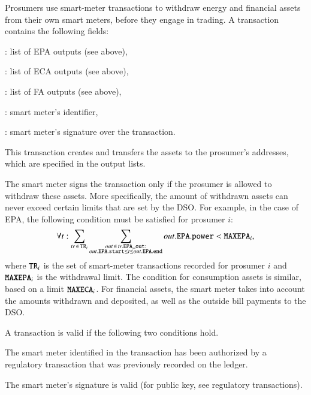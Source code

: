 Prosumers use smart-meter transactions to withdraw energy and financial assets from their own smart meters, before they engage in trading.
%
A transaction contains the following fields:
\begin{compactitem}
\item {}: list of EPA outputs (see above),
\item {}: list of ECA outputs (see above),
\item {}: list of FA outputs (see above),
\item {}: smart meter's identifier,
\item {}: smart meter's signature over the transaction.
\end{compactitem}
This transaction creates and transfers the assets to the prosumer's addresses, which are specified in the output lists.

The smart meter signs the transaction only if the prosumer is allowed to withdraw these assets.
More specifically, the amount of withdrawn assets can never exceed certain limits that are set by the DSO.
For example, in the case of EPA, the following condition must be satisfied for prosumer $i$:
\begin{equation}
\forall t: \sum_{tr \,\in\, \texttt{TR}_i} \sum_{\substack{out \,\in\, tr.\texttt{EPA\_out}:\\out.\texttt{EPA}.\texttt{start} \leq t \leq out.\texttt{EPA}.\texttt{end}}} out.\texttt{EPA}.\texttt{power} < \texttt{MAXEPA}_i ,
\end{equation}
where $\texttt{TR}_i$ is the set of smart-meter transactions recorded for prosumer $i$ and $\texttt{MAXEPA}_i$ is the withdrawal limit.
The condition for consumption assets is similar, based on a limit $\texttt{MAXECA}_i$.
For financial assets, the smart meter takes into account the amounts withdrawn and deposited, as well as the outside bill payments to the DSO.

A transaction is valid if the following two conditions hold.
\begin{compactitem}
\item The smart meter identified in the transaction has been authorized by a regulatory transaction that was previously recorded on the ledger.
\item The smart meter's signature is valid (for public key, see regulatory transactions).
\end{compactitem}

